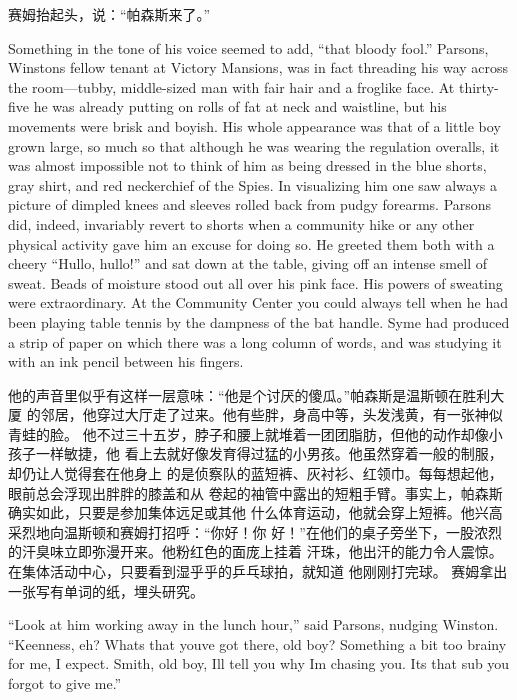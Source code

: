 \begin{paracol}{2}
赛姆抬起头，说：``帕森斯来了。''

\switchcolumn*

Something in the tone of his voice seemed to add, ``that bloody fool.''
Parsons, Winston\textquotesingle s fellow tenant at Victory Mansions,
was in fact threading his way across the room---tubby, middle-sized man
with fair hair and a froglike face. At thirty-five he was already
putting on rolls of fat at neck and waistline, but his movements were
brisk and boyish. His whole appearance was that of a little boy grown
large, so much so that although he was wearing the regulation overalls,
it was almost impossible not to think of him as being dressed in the
blue shorts, gray shirt, and red neckerchief of the Spies. In
visualizing him one saw always a picture of dimpled knees and sleeves
rolled back from pudgy forearms. Parsons did, indeed, invariably revert
to shorts when a community hike or any other physical activity gave him
an excuse for doing so. He greeted them both with a cheery ``Hullo,
hullo!'' and sat down at the table, giving off an intense smell of sweat.
Beads of moisture stood out all over his pink face. His powers of
sweating were extraordinary. At the Community Center you could always
tell when he had been playing table tennis by the dampness of the bat
handle. Syme had produced a strip of paper on which there was a long
column of words, and was studying it with an ink pencil between his
fingers.

\switchcolumn

他的声音里似乎有这样一层意味：``他是个讨厌的傻瓜。''帕森斯是温斯顿在胜利大厦
的邻居，他穿过大厅走了过来。他有些胖，身高中等，头发浅黄，有一张神似青蛙的脸。
他不过三十五岁，脖子和腰上就堆着一团团脂肪，但他的动作却像小孩子一样敏捷，他
看上去就好像发育得过猛的小男孩。他虽然穿着一般的制服，却仍让人觉得套在他身上
的是侦察队的蓝短裤、灰衬衫、红领巾。每每想起他，眼前总会浮现出胖胖的膝盖和从
卷起的袖管中露出的短粗手臂。事实上，帕森斯确实如此，只要是参加集体远足或其他
什么体育运动，他就会穿上短裤。他兴高采烈地向温斯顿和赛姆打招呼：``你好！你
好！''在他们的桌子旁坐下，一股浓烈的汗臭味立即弥漫开来。他粉红色的面庞上挂着
汗珠，他出汗的能力令人震惊。在集体活动中心，只要看到湿乎乎的乒乓球拍，就知道
他刚刚打完球。 赛姆拿出一张写有单词的纸，埋头研究。

\switchcolumn*

``Look at him working away in the lunch hour,'' said Parsons, nudging
Winston. ``Keenness, eh? What\textquotesingle s that
you\textquotesingle ve got there, old boy? Something a bit too brainy
for me, I expect. Smith, old boy, I\textquotesingle ll tell you why
I\textquotesingle m chasing you. It\textquotesingle s that sub you
forgot to give me.''


\end{paracol}

